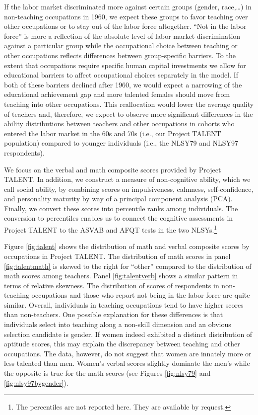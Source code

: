 \documentclass[onehalfspacing,11pt]{article}
\begin{document}
	If the labor market discriminated more against certain groups (gender, race,\ldots) in non-teaching occupations in 1960, we expect these groups to favor teaching over other occupations or to stay out of the labor force altogether. ``Not in the labor force'' is more a reflection of the absolute level of labor market discrimination against a particular group while the occupational choice between teaching or other occupations reflects differences between group-specific barriers. To the extent that occupations require specific human capital investments we allow for educational barriers to affect occupational choices separately in the model. If both of these barriers declined after 1960, we would expect a narrowing of the educational achievement gap and more talented females should move from teaching into other occupations. This reallocation would lower the average quality of teachers and, therefore, we expect to observe more significant differences in the ability distributions between teachers and other occupations in cohorts who entered the labor market in the 60s and 70s (i.e., our Project TALENT population) compared to younger individuals (i.e., the NLSY79 and NLSY97 respondents).
	
	We focus on the verbal and math composite scores provided by Project TALENT. In addition, we construct a measure of non-cognitive ability, which we call social ability, by combining scores on impulsiveness, calmness, self-confidence, and personality maturity by way of a principal component analysis (PCA). Finally, we convert these scores into percentile ranks among individuals. The conversion to percentiles enables us to connect the cognitive assessments in Project TALENT to the ASVAB and AFQT tests in the two NLSYs.\footnote{The percentiles are not reported here. They are available by request.} 
	
	Figure \ref{fig:talent} shows the distribution of math and verbal composite scores by occupations in Project TALENT. The distribution of math scores in panel \ref{fig:talentmath} is skewed to the right for ``other'' compared to the distribution of math scores among teachers. Panel \ref{fig:talentverb} shows a similar pattern in terms of relative skewness. The distribution of scores of respondents in non-teaching occupations and those who report not being in the labor force are quite similar. Overall, individuals in teaching occupations tend to have higher scores than non-teachers. One possible explanation for these differences is that individuals select into teaching along a non-skill dimension and an obvious selection candidate is gender. If women indeed exhibited a distinct distribution of aptitude scores, this may explain the discrepancy between teaching and other occupations. The data, however, do not suggest that women are innately more or less talented than men. Women's verbal scores slightly dominate the men's while the opposite is true for the math scores (see Figures \ref{fig:nlsy79} and \ref{fig:nlsy97bygender}).
	
\end{document}
